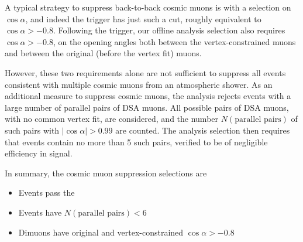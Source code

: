 A typical strategy to suppress back-to-back cosmic muons is with a selection on $\cos{\alpha}$, and indeed the trigger has just such a cut, roughly equivalent to $\cos{\alpha} > -0.8$.
Following the trigger, our offline analysis selection also requires $\cos{\alpha} > -0.8$, on the opening angles both between the vertex-constrained muons and between the original (before the vertex fit) muons.

However, these two requirements alone are not sufficient to suppress all events consistent with multiple cosmic muons from an atmospheric shower.
As an additional measure to suppress cosmic muons, the analysis rejects events with a large number of parallel pairs of DSA muons.
All possible pairs of DSA muons, with no common vertex fit, are considered, and the number $N(\text{parallel pairs})$ of such pairs with $|\cos{\alpha}| > 0.99$ are counted.
The analysis selection then requires that events contain no more than 5 such pairs, verified to be of negligible efficiency in signal.

In summary, the cosmic muon suppression selections are
\begin{itemize}
  \item Events pass the 
  \item Events have $N(\text{parallel pairs}) < 6$
  \item Dimuons have original and vertex-constrained $\cos{\alpha} > -0.8$
\end{itemize}

